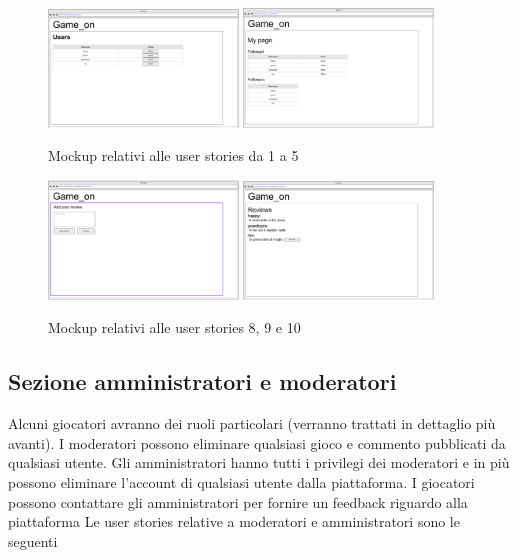 \begin{figure}[h!]
\centering
\includegraphics[width=0.45\textwidth]{mockup_lista_utenti}
\includegraphics[width=0.45\textwidth]{mockup_lista_amici}
\caption{Mockup relativi alle user stories da 1 a 5}
\end{figure}

\begin{figure}[h!]
\centering
\includegraphics[width=0.45\textwidth]{mockup_add_review}
\includegraphics[width=0.45\textwidth]{mockup_reviews}
\caption{Mockup relativi alle user stories 8, 9 e 10}
\end{figure}

\subsection{Sezione amministratori e moderatori}

Alcuni giocatori avranno dei ruoli particolari (verranno trattati in dettaglio più avanti). I moderatori possono eliminare qualsiasi gioco e commento pubblicati da qualsiasi utente. Gli amministratori hanno tutti i privilegi dei moderatori e in più possono eliminare l'account di qualsiasi utente dalla piattaforma. I giocatori possono contattare gli amministratori per fornire un feedback riguardo alla piattaforma
\newline
Le user stories relative a moderatori e amministratori sono le seguenti


